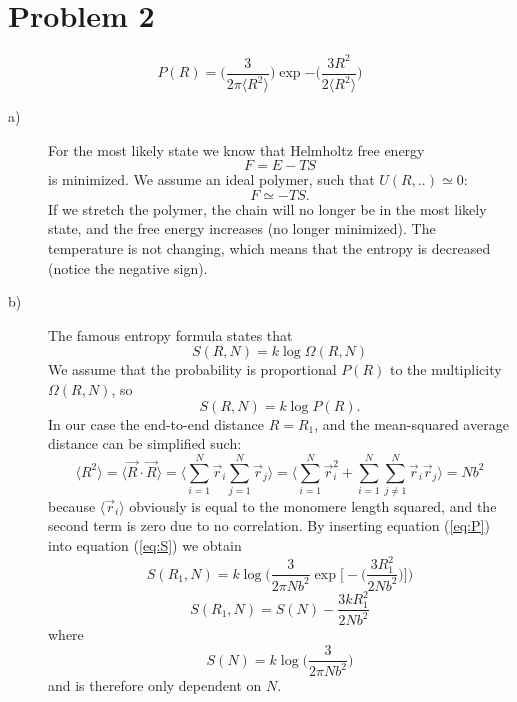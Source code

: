 \documentclass[norsk,a4paper,12pt]{article}
\begin{document}
\section*{Problem 2}
\begin{equation}
P(R)=\bigg(\frac{3}{2\pi\langle R^2\rangle}\bigg)\exp{-\bigg(\frac{3R^2}{2\langle R^2\rangle}\bigg)}
\label{eq:P}
\end{equation}
\begin{description}
\item [a)]For the most likely state we know that Helmholtz free energy 
\begin{equation}
F=E-TS
\end{equation}
is minimized. We assume an ideal polymer, such that $U(R,..)\simeq0$:
\begin{equation}
F\simeq-TS.
\end{equation}
If we stretch the polymer, the chain will no longer be in the most likely state, and the free energy increases (no longer minimized). The temperature is not changing, which means that the entropy is decreased (notice the negative sign).
\item [b)] The famous entropy formula states that
\begin{equation}
S(R,N)=k\log\Omega(R,N)
\end{equation}
We assume that the probability is proportional $P(R)$ to the multiplicity $\Omega(R,N)$, so
\begin{equation}
S(R,N)=k\log P(R).
\label{eq:S}
\end{equation}
In our case the end-to-end distance $R=R_1$, and the mean-squared average distance can be simplified such:
\begin{equation}
\langle R^2\rangle=\langle\vec{R}\cdot\vec{R}\rangle= \bigg\langle\sum_{i=1}^N\vec{r}_i\sum_{j=1}^N\vec{r}_j\bigg\rangle= \bigg\langle\sum_{i=1}^N\vec{r}_i^2+\sum_{i=1}^N\sum_{j\neq1}^N\vec{r}_i\vec{r}_j\bigg\rangle=Nb^2
\end{equation}
because $\langle \vec{r}_i\rangle$ obviously is equal to the monomere length squared, and the second term is zero due to no correlation. By inserting equation (\ref{eq:P}) into equation (\ref{eq:S}) we obtain
$$S(R_1,N)=k\log\Bigg(\frac{3}{2\pi Nb^2}\exp{\bigg[-\bigg(\frac{3R_1^2}{2Nb^2}\bigg)\bigg]}\Bigg)$$
\begin{equation}
S(R_1,N)=S(N)-\frac{3kR_1^2}{2Nb^2}
\end{equation}
where 
\begin{equation}
S(N)=k\log\bigg(\frac{3}{2\pi Nb^2}\bigg)
\end{equation}
and is therefore only dependent on $N$.

\end{description}
\end{document}
